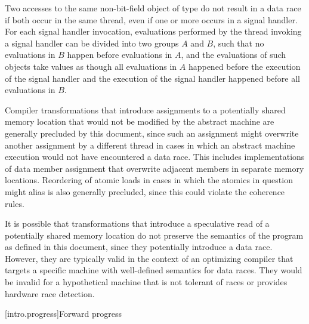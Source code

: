 \pnum
Two accesses to the same non-bit-field object
of type  do not
result in a data race if both occur in the same thread, even if one or more
occurs in a signal handler. For each signal handler invocation, evaluations
performed by the thread invoking a signal handler can be divided into two
groups $A$ and $B$, such that no evaluations in
$B$ happen before evaluations in $A$, and the
evaluations of such  objects take values as though
all evaluations in $A$ happened before the execution of the signal
handler and the execution of the signal handler happened before all evaluations
in $B$.

\pnum
\begin{note}
Compiler transformations that introduce assignments to a potentially
shared memory location that would not be modified by the abstract machine are
generally precluded by this document, since such an assignment might overwrite
another assignment by a different thread in cases in which an abstract machine
execution would not have encountered a data race. This includes implementations
of data member assignment that overwrite adjacent members in separate memory
locations. Reordering of atomic loads in cases in which the atomics in question
might alias is also generally precluded, since this could violate the coherence
rules.
\end{note}

\pnum
\begin{note}
It is possible that transformations that introduce a speculative read of a potentially
shared memory location do not preserve the semantics of the \Cpp{} program as
defined in this document, since they potentially introduce a data race. However,
they are typically valid in the context of an optimizing compiler that targets a
specific machine with well-defined semantics for data races. They would be
invalid for a hypothetical machine that is not tolerant of races or provides
hardware race detection.
\end{note}

[intro.progress]{Forward progress}

